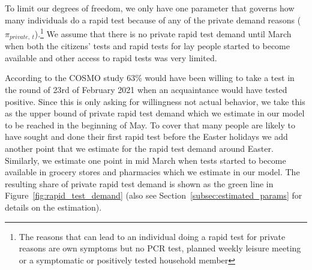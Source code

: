 
To limit our degrees of freedom, we only have one parameter that governs how many
individuals do a rapid test because of any of the private demand reasons
($\pi_{private,\:t}$).\footnote{The reasons that can lead to an individual doing a rapid
test for private reasons are own symptoms but no PCR test, planned weekly leisure meeting
or a symptomatic or positively tested household member}
We assume that there is no private rapid test demand until March when both the citizens'
tests and rapid tests for lay people started to become available
\citep{Bundesanzeiger2021a, Bundesregierung2021} and other access to rapid tests was very
limited.

According to the COSMO study \citep{Betsch2021a} 63\% would have been willing to take a
test in the round of 23rd of February 2021 when an acquaintance would have tested
positive. Since this is only asking for willingness not actual behavior, we take this as
the upper bound of private rapid test demand which we estimate in our model to be reached
in the beginning of May. To cover that many people are likely to have sought and done
their first rapid test before the Easter holidays we add another point that we estimate
for the rapid test demand around Easter. Similarly, we estimate one point in mid March
when tests started to become available in grocery stores and pharmacies which we estimate
in our model. The resulting share of private rapid test demand is shown as the green line
in Figure~\ref{fig:rapid_test_demand} (also see Section~\ref{subsec:estimated_params} for
details on the estimation).


